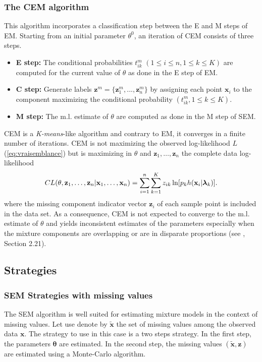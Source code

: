 \documentclass[a4paper,10pt]{article}
\newcommand{\bx}{\mathbf{x}}
\newcommand{\bz}{\mathbf{z}}
\newcommand{\blambda}{\boldsymbol{\lambda}}
\newcommand{\btheta}{\boldsymbol{\theta}}
\begin{document}
\subsubsection{The CEM algorithm}
This algorithm incorporates a classification step between the E and M steps of EM. Starting
from an initial parameter $\theta^0$, an iteration of CEM consists of three steps.
\begin{itemize}
\item {\bf E step:} The conditional probabilities $t^m_{ik}$ $(1 \leq i \leq n, 1 \leq k \leq
  K)$ are computed for the current value of $\theta$ as done in the E step of EM.
\item {\bf C step:} Generate labels ${\bz}^m=\{ {\bz}^m_1,...,{\bz}^m_n\}$ by assigning each
  point ${\bx}_i$ to the component maximizing the conditional probability
  $(t^m_{ik}, 1 \leq k \leq K)$.
\item {\bf M step:} The m.l. estimate of $\theta$ are computed as done in the M step of SEM.
\end{itemize}
CEM is a {\em K-means}-like algorithm and contrary to EM, it converges in a finite number of
iterations. CEM is not maximizing the observed log-likelihood $L$ (\ref{eq:vraisemblance}) but
is maximizing in $\theta$ and $\bz_{1},\ldots,\bz_{n}$ the complete data log-likelihood
\begin{equation} \label{cl}
  CL(\theta, {\bf z}_{1},\ldots,{\bf z}_{n}|{\bf
    x}_{1},\ldots,{\bf x}_{n}) = \sum_{i=1}^n\sum_{k=1}^{K}
  z_{ik}\ln[p_{k} h({\bf x}_i|\blambda_k)].
\end{equation}
where the missing component indicator vector $\bz_i$ of each sample point is
included in the data set. As a consequence, CEM is not expected to converge to the m.l.
estimate of $\theta$ and yields inconsistent estimates of the parameters especially when the
mixture components are overlapping or are in disparate proportions (see \cite{McLachlanPeel00}, Section 2.21).

\subsection{Strategies}

\subsubsection{SEM Strategies with missing values}

The SEM algorithm is well suited for estimating mixture models in the context of missing values.
Let use denote by $\tilde{\bx}$ the set of missing values among the observed data $\bx$.
The strategy to use in this case is a two steps strategy. In the first step, the parameters $\btheta$
are estimated. In the second step, the missing values $(\tilde{\bx},\bz)$ are estimated using a Monte-Carlo algorithm.
\end{document}
